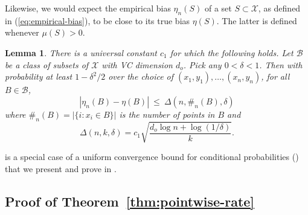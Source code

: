 \documentclass{article}
\def\X{{\mathcal X}}
\def\B{{\mathcal B}}
\newtheorem{lemma}[theorem]{Lemma}
\begin{document}
Likewise, we would expect the empirical bias $\eta_n(S)$ of a set $S \subset \X$, as defined in (\ref{eq:empirical-bias}), to be close to its true bias $\eta(S)$. The latter is defined whenever $\mu(S) > 0$.
\begin{lemma}
There is a universal constant $c_1$ for which the following holds. Let $\B$ be a class of subsets of $\X$ with VC dimension $d_o$. Pick any $0 < \delta < 1$. Then with probability at least $1-\delta^2/2$ over the choice of $(x_1, y_1), \ldots, (x_n, y_n)$, for all $B \in \B$,
  $$ \left| \eta_n(B) - \eta(B) \right| \ \leq \ \Delta(n, \#_n(B), \delta) $$
where $\#_n(B) = |\{i: x_i \in B\}|$ is the number of points in $B$ and 
\begin{equation}
\Delta(n,k,\delta) = c_1 \sqrt{\frac{d_o \log n + \log (1/\delta)}{k}} .
\label{eq:delta-defn}
\end{equation}
\label{lemma:bias}
\end{lemma}

 is a special case of a uniform convergence bound for conditional probabilities () 
that we present and prove in .

\subsection{Proof of Theorem~\ref{thm:pointwise-rate}}
\end{document}
